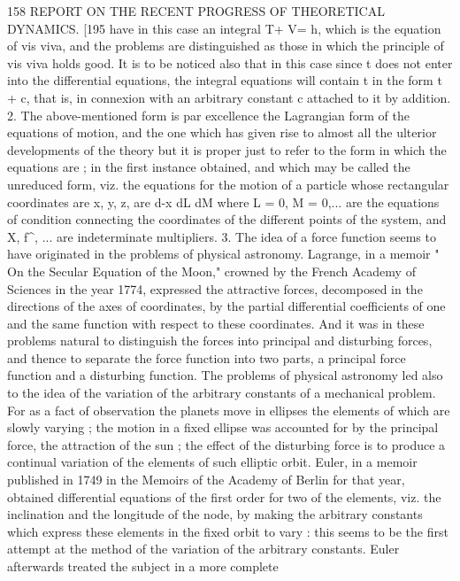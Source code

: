 \documentclass[12pt,a4paper]{article}
\theoremstyle{definition}
\begin{document}

158 REPORT ON THE RECENT PROGRESS OF THEORETICAL DYNAMICS.
[195
have in this case an integral T+ V= h, which is the equation of vis viva, and the
problems are distinguished as those in which the principle of vis viva holds good. It
is to be noticed also that in this case since t does not enter into the differential
equations, the integral equations will contain t in the form t + c, that is, in connexion
with an arbitrary constant c attached to it by addition.
2. The above-mentioned form is par excellence the Lagrangian form of the equations
of motion, and the one which has given rise to almost all the ulterior developments
of the theory but it is proper just to refer to the form in which the equations are
;
in the first instance obtained, and which may be called the unreduced form, viz. the
equations for the motion of a particle whose rectangular coordinates are x, y, z, are
d-x dL dM
where L = 0, M = 0,... are the equations of condition connecting the coordinates of the
different points of the system, and X, f^, ... are indeterminate multipliers.
3. The idea of a force function seems to have originated in the problems of
physical astronomy. Lagrange, in a memoir " On the Secular Equation of the Moon,"
crowned by the French Academy of Sciences in the year 1774, expressed the attractive
forces, decomposed in the directions of the axes of coordinates, by the partial differential
coefficients of one and the same function with respect to these coordinates. And it
was in these problems natural to distinguish the forces into principal and disturbing
forces, and thence to separate the force function into two parts, a principal force
function and a disturbing function. The problems of physical astronomy led also to
the idea of the variation of the arbitrary constants of a mechanical problem. For as
a fact of observation the planets move in ellipses the elements of which are slowly
varying ; the motion in a fixed ellipse was accounted for by the principal force, the
attraction of the sun ; the effect of the disturbing force is to produce a continual
variation of the elements of such elliptic orbit. Euler, in a memoir published in 1749
in the Memoirs of the Academy of Berlin for that year, obtained differential equations
of the first order for two of the elements, viz. the inclination and the longitude of
the node, by making the arbitrary constants which express these elements in the fixed
orbit to vary : this seems to be the first attempt at the method of the variation of
the arbitrary constants. Euler afterwards treated the subject in a more complete
\end{document}
